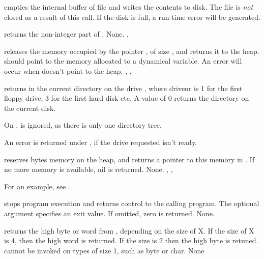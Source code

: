 \documentclass{report}
\begin{document}


{ empties the internal buffer of file  and writes the
contents to disk. The file is \textit{not} closed as a result of this call.}
{If the disk is full, a run-time error will be generated.}
{}



{ returns the non-integer part of .}
{None.}
{, }



{ releases the memory occupied by the pointer , of size
, and returns it to the heap.  should point to the memory
allocated to a dynamical variable.}
{An error will occur when  doesn't point to the heap.}
{, , }



{ returns in  the current directory on the drive
, where {drivenr} is 1 for the first floppy drive, 3 for the
first hard disk etc. A value of 0 returns the directory on the current disk.

On \linux,  is ignored, as there is only one directory tree.}
{An error is returned under \dos, if the drive requested isn't ready.}
{}



{ reserves  bytes memory on the heap, and returns a
pointer to this memory in . If no more memory is available, nil is
returned.}
{None.}
{, , }

For an example, see .

{ stops program execution and returns control to the calling
program. The optional argument  specifies an exit value. If
omitted, zero is returned.}
{None.}
{}



{ returns the high byte or word from , depending on the size
of X. If the size of X is 4, then the high word is returned. If the size is
2 then the high byte is retuned. 
 cannot be invoked on types of size 1, such as byte or char.}
{None}
{}
\end{document}
